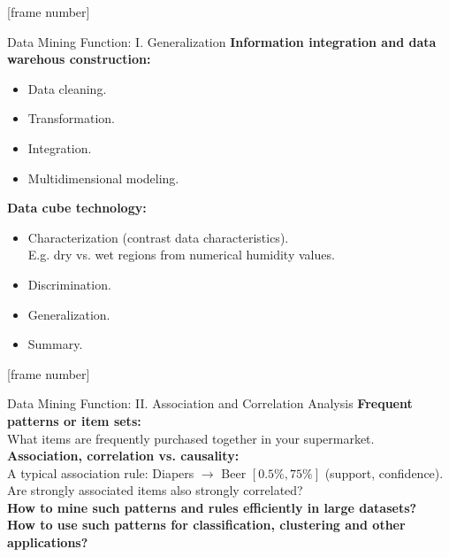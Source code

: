 \documentclass[aspectratio=169,t]{beamer}
\begin{document}
  {
    [frame number]
    \begin{frame}{Data Mining Function: I. Generalization}
    \textbf{Information integration and data warehous construction:}
    \begin{itemize}
        \item Data cleaning.
        \item Transformation.
        \item Integration.
        \item Multidimensional modeling.
    \end{itemize}
    \textbf{Data cube technology:}
    \begin{itemize}
        \item Characterization (contrast data characteristics).\\
              E.g. dry vs. wet regions from numerical humidity values.
        \item Discrimination.
        \item Generalization.
        \item Summary.
    \end{itemize}
    \end{frame}
  }

  {
    [frame number]
    \begin{frame}{Data Mining Function: II. Association and Correlation Analysis}
    \textbf{Frequent patterns or item sets:}\\
    What items are frequently purchased together in your supermarket.\\[0.5cm]

    \textbf{Association, correlation vs. causality:}\\
    A typical association rule: Diapers $\rightarrow$ Beer $[0.5\%,75\%]$ (support, confidence).\\
    Are strongly associated items also strongly correlated?\\[0.5cm]

    \textbf{How to mine such patterns and rules efficiently in large datasets?}\\
    \textbf{How to use such patterns for classification, clustering and other applications?}
    \end{frame}
  }
\end{document}
